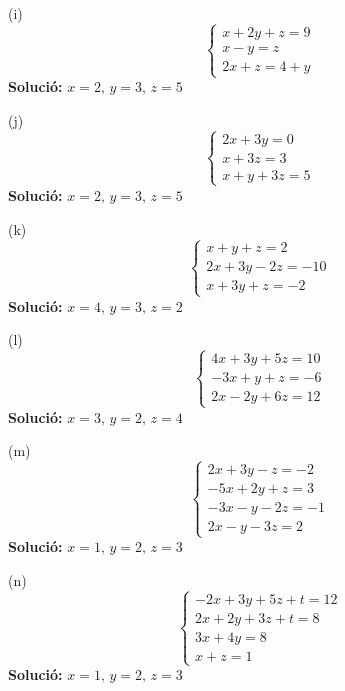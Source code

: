 \documentclass[12pt]{article}
\begin{document}
\begin{exercici}
(i)
\[
\begin{cases}
x + 2y + z = 9 \\
x - y = z \\
2x + z = 4 + y
\end{cases}
\]
\textbf{Solució:} \( x = 2, \, y = 3, \, z = 5 \)
\end{exercici}

\begin{exercici}
(j)
\[
\begin{cases}
2x + 3y = 0 \\
x + 3z = 3 \\
x + y + 3z = 5
\end{cases}
\]
\textbf{Solució:} \( x = 2, \, y = 3, \, z = 5 \)
\end{exercici}

\begin{exercici}
(k)
\[
\begin{cases}
x + y + z = 2 \\
2x + 3y - 2z = -10 \\
x + 3y + z = -2
\end{cases}
\]
\textbf{Solució:} \( x = 4, \, y = 3, \, z = 2 \)
\end{exercici}

\begin{exercici}
(l)
\[
\begin{cases}
4x + 3y + 5z = 10 \\
-3x + y + z = -6 \\
2x - 2y + 6z = 12
\end{cases}
\]
\textbf{Solució:} \( x = 3, \, y = 2, \, z = 4 \)
\end{exercici}

\begin{exercici}
(m)
\[
\begin{cases}
2x + 3y - z = -2 \\
-5x + 2y + z = 3 \\
-3x - y - 2z = -1 \\
2x - y - 3z = 2
\end{cases}
\]
\textbf{Solució:} \( x = 1, \, y = 2, \, z = 3 \)
\end{exercici}

\begin{exercici}
(n)
\[
\begin{cases}
-2x + 3y + 5z + t = 12 \\
2x + 2y + 3z + t = 8 \\
3x + 4y = 8 \\
x + z = 1
\end{cases}
\]
\textbf{Solució:} \( x = 1, \, y = 2, \, z = 3 \)
\end{exercici}
\end{document}
